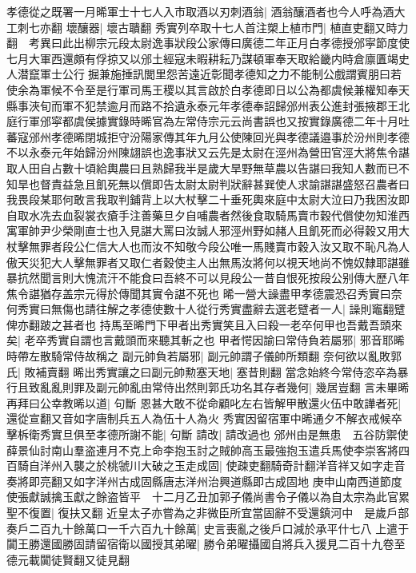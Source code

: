 孝德從之既署一月晞軍士十七人入市取酒以刃刺酒翁|{
	酒翁釀酒者也今人呼為酒大工刺七亦翻}
壞釀器|{
	壞古聵翻}
秀實列卒取十七人首注槊上植市門|{
	植直吏翻又時力翻　考異曰此出柳宗元段太尉逸事狀段公家傳曰廣德二年正月白孝德授邠寜節度使七月大軍西還頗有俘掠又以邠土經寇未暇耕耘乃謀頓軍奉天取給畿内時倉廪匱竭史人潜竄軍士公行掘兼施捶訊閭里怨苦遠近彰聞孝德知之力不能制公戲謂賓朋曰若使余為軍候不令至是行軍司馬王稷以其言啟於白孝德即日以公為都虞候兼權知奉天縣事浹旬而軍不犯禁逾月而路不拾遺永泰元年孝德奉詔歸邠州表公進封張掖郡王北庭行軍邠寜都虞侯據實錄時晞官為左常侍宗元云尚書誤也又按實錄廣德二年十月吐蕃寇邠州孝德晞閉城拒守汾陽家傳其年九月公使陳回光與孝德議邉事於汾州則孝德不以永泰元年始歸汾州陳翃誤也逸事狀又云先是太尉在涇州為營田官涇大將焦令諶取人田自占數十頃給輿農曰且熟歸我半是歲大旱野無草農以告諶曰我知人數而已不知旱也督責益急且飢死無以償即告太尉太尉判狀辭甚巽使人求諭諶諶盛怒召農者曰我畏段某耶何敢言我取判鋪背上以大杖擊二十垂死輿來庭中太尉大泣曰乃我困汝即自取水冼去血裂裳衣瘡手注善藥旦夕自哺農者然後食取騎馬賣市穀代償使勿知淮西寓軍帥尹少榮剛直士也入見諶大罵曰汝誠人邪涇州野如赭人且飢死而必得穀又用大杖擊無罪者段公仁信大人也而汝不知敬今段公唯一馬賤賣市穀入汝又取不恥凡為人傲天災犯大人擊無罪者又取仁者穀使主人出無馬汝將何以視天地尚不愧奴隸耶諶雖暴抗然聞言則大愧流汗不能食曰吾終不可以見段公一昔自恨死按段公别傳大歷八年焦令諶猶存盖宗元得於傳聞其實令諶不死也}
晞一營大譟盡甲孝德震恐召秀實曰奈何秀實曰無傷也請往解之孝德使數十人從行秀實盡辭去選老躄者一人|{
	譟則竈翻躄俾亦翻跛之甚者也}
持馬至晞門下甲者出秀實笑且入曰殺一老卒何甲也吾戴吾頭來矣|{
	老卒秀實自謂也言戴頭而來聽其斬之也}
甲者愕因諭曰常侍負若屬邪|{
	邪音耶晞時帶左散騎常侍故稱之}
副元帥負若屬邪|{
	副元帥謂子儀帥所類翻}
奈何欲以亂敗郭氏|{
	敗補賣翻}
晞出秀實讓之曰副元帥勲塞天地|{
	塞昔則翻}
當念始終今常侍恣卒為暴行且致亂亂則罪及副元帥亂由常侍出然則郭氏功名其存者幾何|{
	幾居豈翻}
言未畢晞再拜曰公幸教晞以道|{
	句斷}
恩甚大敢不從命顧叱左右皆解甲散還火伍中敢譁者死|{
	還從宣翻又音如字唐制兵五人為伍十人為火}
秀實因留宿軍中晞通夕不解衣戒候卒擊柝衛秀實旦俱至孝德所謝不能|{
	句斷}
請改|{
	請改過也}
邠州由是無患　五谷防禦使薛景仙討南山羣盗連月不克上命李抱玉討之賊帥高玉最強抱玉遣兵馬使李崇客將四百騎自洋州入襲之於桃虢川大破之玉走成固|{
	使疎吏翻騎奇計翻洋音祥又如字走音奏將即亮翻又如字洋州古成固縣唐志洋州治興道縣即古成固地}
庚申山南西道節度使張獻誠擒玉獻之餘盗皆平　十二月乙丑加郭子儀尚書令子儀以為自太宗為此官累聖不復置|{
	復扶又翻}
近皇太子亦嘗為之非微臣所宜當固辭不受還鎮河中　是歲戶部奏戶二百九十餘萬口一千六百九十餘萬|{
	史言喪亂之後戶口減於承平什七八}
上遣于闐王勝還國勝固請留宿衛以國授其弟曜|{
	勝令弟曜攝國自將兵入援見二百十九卷至德元載闐徒賢翻又徒見翻}
